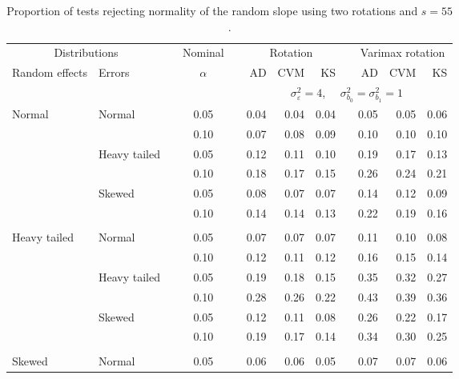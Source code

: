 \begin{table}[ht]
\centering
\caption{\label{tab:simb155}Proportion of tests rejecting normality of the random slope using two rotations and $s = 55$.}
\begin{scriptsize}
\begin{tabular}{ll p{.1cm} c p{.1cm} rrr p{.1cm} rrr}
  \hline
  \multicolumn{2}{c}{Distributions}& & Nominal & &  \multicolumn{3}{c}{Rotation} & & \multicolumn{3}{c}{Varimax rotation} \\ \cline{1-2} \cline{6-8} \cline{10-12}   
  Random effects & Errors & & $\alpha$ & & AD & CVM & KS & & AD & CVM & KS \\ 
   \hline
& && && \multicolumn{7}{c}{$\sigma_{\varepsilon}^2 = 4$, \ \ $\sigma_{b_0}^2 = \sigma_{b_1}^2 = 1$} \\ \cline{6-12}
\rowcolor{gray!20}Normal       & Normal       && 0.05 &&  0.04 & 0.04 & 0.04 && 0.05 & 0.05 & 0.06 \\ 
\rowcolor{gray!20}             &              && 0.10 &&  0.07 & 0.08 & 0.09 && 0.10 & 0.10 & 0.10 \\ 
\rowcolor{gray!20}             & Heavy tailed && 0.05 &&  0.12 & 0.11 & 0.10 && 0.19 & 0.17 & 0.13 \\ 
\rowcolor{gray!20}             &              && 0.10 &&  0.18 & 0.17 & 0.15 && 0.26 & 0.24 & 0.21 \\ 
\rowcolor{gray!20}             & Skewed       && 0.05 &&  0.08 & 0.07 & 0.07 && 0.14 & 0.12 & 0.09 \\ 
\rowcolor{gray!20}             &              && 0.10 &&  0.14 & 0.14 & 0.13 && 0.22 & 0.19 & 0.16 \\ 
             &&&&&&&&&&&\\
Heavy tailed & Normal       && 0.05 &&  0.07 & 0.07 & 0.07 && 0.11 & 0.10 & 0.08 \\ 
             &              && 0.10 &&  0.12 & 0.11 & 0.12 && 0.16 & 0.15 & 0.14 \\ 
             & Heavy tailed && 0.05 &&  0.19 & 0.18 & 0.15 && 0.35 & 0.32 & 0.27 \\ 
             &              && 0.10 &&  0.28 & 0.26 & 0.22 && 0.43 & 0.39 & 0.36 \\ 
             & Skewed       && 0.05 &&  0.12 & 0.11 & 0.08 && 0.26 & 0.22 & 0.17 \\ 
             &              && 0.10 &&  0.19 & 0.17 & 0.14 && 0.34 & 0.30 & 0.25 \\ 
             &&&&&&&&&&&\\
Skewed       & Normal       && 0.05 &&  0.06 & 0.06 & 0.05 && 0.07 & 0.07 & 0.06 \\ 

\end{tabular}
\end{scriptsize}
\end{table}
